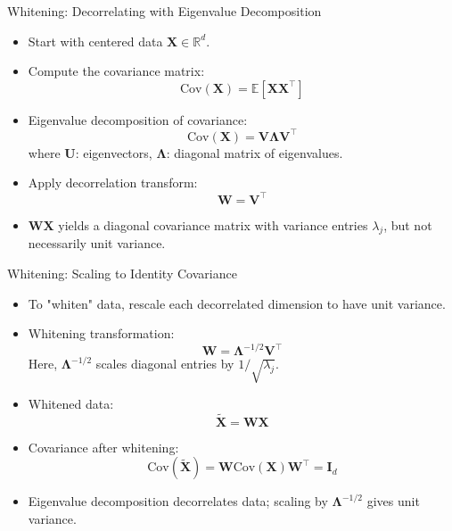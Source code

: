 \documentclass{beamer}
\begin{document}
\begin{frame}{Whitening: Decorrelating with Eigenvalue Decomposition}
  \begin{itemize}
    \item Start with centered data $\mathbf{X} \in \mathbb{R}^d$.
    \item Compute the covariance matrix:
    \[
      \mathrm{Cov}(\mathbf{X}) = \mathbb{E}[\mathbf{X}\mathbf{X}^\top]
    \]
    \item Eigenvalue decomposition of covariance:
    \[
      \mathrm{Cov}(\mathbf{X}) = \mathbf{V}\mathbf{\Lambda}\mathbf{V}^\top
    \]
    where $\mathbf{U}$: eigenvectors, $\mathbf{\Lambda}$: diagonal matrix of eigenvalues.
    \item Apply decorrelation transform:
    \[
      \mathbf{W} = \mathbf{V}^\top
    \]
    \item $\mathbf{W}\mathbf{X}$ yields a diagonal covariance matrix with variance entries $\lambda_j$, but not necessarily unit variance.
  \end{itemize}
\end{frame}

\begin{frame}{Whitening: Scaling to Identity Covariance}
  \begin{itemize}
    \item To "whiten" data, rescale each decorrelated dimension to have unit variance.
    \item Whitening transformation:
    \[
      \mathbf{W} = \mathbf{\Lambda}^{-1/2} \mathbf{V}^\top
    \]
    Here, $\mathbf{\Lambda}^{-1/2}$ scales diagonal entries by $1/\sqrt{\lambda_j}$.
    \item Whitened data:
    \[
      \widetilde{\mathbf{X}} = \mathbf{W}\mathbf{X}
    \]
    \item Covariance after whitening:
    \[
      \mathrm{Cov}(\widetilde{\mathbf{X}}) = \mathbf{W}\mathrm{Cov}(\mathbf{X})\mathbf{W}^\top = \mathbf{I}_d
    \]
    \item Eigenvalue decomposition decorrelates data; scaling by $\mathbf{\Lambda}^{-1/2}$ gives unit variance.
  \end{itemize}
\end{frame}
\end{document}
